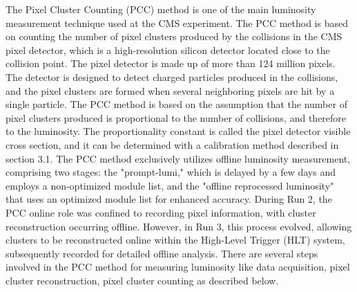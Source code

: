 The Pixel Cluster Counting (PCC) method is one of the main luminosity measurement technique used at the CMS experiment. The PCC method is based on counting the number of pixel clusters produced by the collisions in the CMS pixel detector, which is a high-resolution silicon detector located close to the collision point. The pixel detector is made up of more than 124 million pixels. The detector is designed to detect charged particles produced in the collisions, and the pixel clusters are formed when several neighboring pixels are hit by a single particle. The PCC method is based on the assumption that the number of pixel clusters produced is proportional to the number of collisions, and therefore to the luminosity. The proportionality constant is called the pixel detector visible cross section, and it can be determined with a calibration method described in section 3.1. The PCC method exclusively utilizes offline luminosity measurement, comprising two stages: the "prompt-lumi," which is delayed by a few days and employs a non-optimized module list, and the "offline reprocessed luminosity" that uses an optimized module list for enhanced accuracy. During Run 2, the PCC online role was confined to recording pixel information, with cluster reconstruction occurring offline. However, in Run 3, this process evolved, allowing clusters to be reconstructed online within the High-Level Trigger (HLT) system, subsequently recorded for detailed offline analysis.
There are several steps involved in the PCC method for measuring luminosity like data acquisition, pixel cluster reconstruction, pixel cluster counting as described below.

